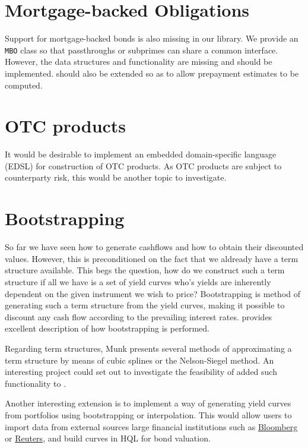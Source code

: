 
\section{Mortgage-backed Obligations}

Support for mortgage-backed bonds is also missing in our library. We provide an 
\texttt{MBO} class so that passthroughs or subprimes can share a common interface.
However, the data structures and functionality are missing and should be 
implemented. \hql should also be extended so as to allow prepayment estimates to
be computed.

\section{OTC products}

It would be desirable to implement an embedded domain-specific 
language (EDSL) for construction of OTC products. As OTC products are
subject to counterparty risk, this would be another topic 
to investigate.

\section{Bootstrapping}

So far we have seen how to generate cashflows and how to obtain their 
discounted values. However, this is preconditioned on the fact that we aldready 
have a term structure available. This begs the question, how do we construct 
such a term structure if all we have is a set of yield curves who's yields 
are inherently dependent on the given instrument we wish to price?
Bootstrapping is method of generating such a term structure from the yield 
curves, making it possible to discount any cash flow according to the 
prevailing interest rates.
\cite{HULL} provides excellent description of how bootstrapping is performed.

Regarding term structures, Munk\cite{cmunk} presents several methods of 
approximating
a term structure by means of cubic splines or the Nelson-Siegel method. An 
interesting project could set out to investigate the feasibility of added such 
functionality to \hql.

Another interesting extension is to implement a way of generating yield curves 
from portfolios using bootstrapping or interpolation\cite{cmunk}.
This would allow users to import data from external sources large financial
institutions such as \href{www.bloomberg.com}{Bloomberg} or
\href{www.reuters.com}{Reuters}, and build curves in HQL for bond valuation.\\

